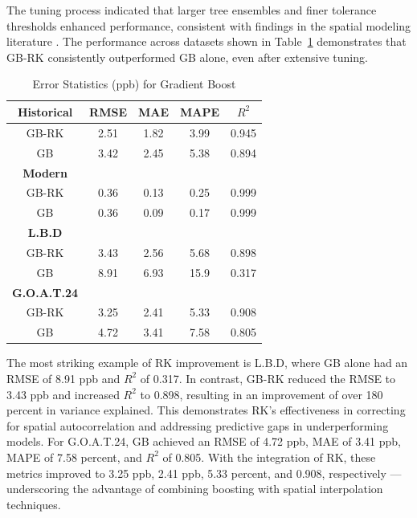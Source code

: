 The tuning process indicated that larger tree ensembles and finer tolerance thresholds enhanced performance, consistent with findings in the spatial modeling literature \parencite{goodchild_scale_2011, adeeb_variation_2004, cavaliere_development_2023, ionascu_calibration_2021, pires_management_2008}. The performance across datasets shown in Table~\ref{tab:gb_model} demonstrates that GB-RK consistently outperformed GB alone, even after extensive tuning. \begin{table}[h!]
    \centering
        \begin{tabular}{||c|cccc||}
            \hline
            \textbf{Historical} & \textbf{RMSE} & \textbf{MAE} & \textbf{MAPE} & \textbf{$R^{2}$} \\[3pt]
            \hline \hline
            GB-RK & 2.51 & 1.82 &  3.99 & 0.945 \\[3pt]
               GB & 3.42 & 2.45 &  5.38 & 0.894 \\
            \hline
            \textbf{Modern}	&   &   &   &   \\[3pt]
            \hline
            GB-RK &  0.36 & 0.13 &  0.25 & 0.999 \\[3pt]
               GB &  0.36 & 0.09 &  0.17 & 0.999 \\
            \hline
            \textbf{L.B.D}	&   &   &   &   \\[3pt]
            \hline
            GB-RK & 3.43 & 2.56 &  5.68 & 0.898 \\[3pt]
               GB & 8.91 & 6.93 & 15.9  & 0.317 \\ 
            \hline
            \textbf{G.O.A.T.24}	&   &   &   &   \\[3pt]
            \hline
            GB-RK & 3.25 & 2.41 &  5.33 & 0.908 \\[3pt]
               GB & 4.72 & 3.41 &  7.58 & 0.805 \\
            \hline
        \end{tabular}
    \caption{Error Statistics (ppb) for Gradient Boost} 
    \label{tab:gb_model}
\end{table} The most striking example of RK improvement is L.B.D, where GB alone had an RMSE of 8.91 ppb and $R^{2}$ of 0.317. In contrast, GB-RK reduced the RMSE to 3.43 ppb and increased $R^{2}$ to 0.898, resulting in an improvement of over 180 percent in variance explained. This demonstrates RK’s effectiveness in correcting for spatial autocorrelation and addressing predictive gaps in underperforming models. For G.O.A.T.24, GB achieved an RMSE of 4.72 ppb, MAE of 3.41 ppb, MAPE of 7.58 percent, and $R^{2}$ of 0.805. With the integration of RK, these metrics improved to 3.25 ppb, 2.41 ppb, 5.33 percent, and 0.908, respectively — underscoring the advantage of combining boosting with spatial interpolation techniques.

